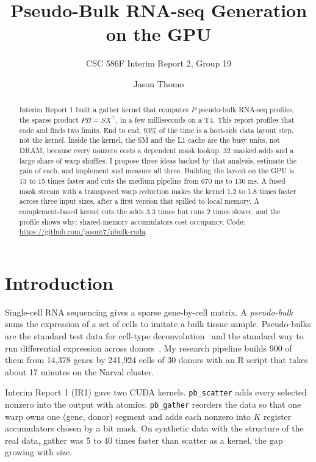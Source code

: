\documentclass[sigconf,nonacm]{acmart}
\newcommand{\code}[1]{\texttt{#1}}
\begin{document}
\title{Pseudo-Bulk RNA-seq Generation on the GPU}
\subtitle{CSC 586F Interim Report 2, Group 19}
\author{Jason Thomo}

\begin{abstract}
Interim Report 1 built a gather kernel that computes $P$ pseudo-bulk RNA-seq profiles, the sparse
product $PB = S X^{\top}$, in a few milliseconds on a T4. This report profiles that code and finds
two limits. End to end, 93\% of the time is a host-side data layout step, not the kernel. Inside the
kernel, the SM and the L1 cache are the busy units, not DRAM, because every nonzero costs a dependent
mask lookup, 32 masked adds and a large share of warp shuffles. I propose three ideas backed by that
analysis, estimate the gain of each, and implement and measure all three. Building the layout on
the GPU is 13 to 15 times faster and cuts the medium pipeline from 670 ms to 130 ms. A fused mask stream
with a transposed warp reduction makes the kernel 1.2 to 1.8 times faster across three input sizes, after a first version that spilled to local memory. A complement-based kernel cuts the adds 3.3 times
but runs 2 times slower, and the profile shows why: shared-memory accumulators cost occupancy. Code: \url{https://github.com/jasont7/pbulk-cuda}.
\end{abstract}

\maketitle

\section{Introduction}

Single-cell RNA sequencing gives a sparse gene-by-cell matrix. A \emph{pseudo-bulk} sums the
expression of a set of cells to imitate a bulk tissue sample. Pseudo-bulks are the standard test data
for cell-type deconvolution~\cite{avilacobos2020} and the standard way to run differential expression
across donors~\cite{squair2021,crowell2020}. My research pipeline builds 900 of them from 14,378 genes
by 241,924 cells of 30 donors with an R script that takes about 17 minutes on the Narval cluster.

Interim Report 1 (IR1) gave two CUDA kernels. \code{pb\_scatter} adds every selected nonzero into the
output with atomics. \code{pb\_gather} reorders the data so that one warp owns one (gene, donor)
segment and adds each nonzero into $K$ register accumulators chosen by a bit mask. On synthetic data
with the structure of the real data, gather was 5 to 40 times faster than scatter as a kernel, the gap growing with size.
\end{document}
